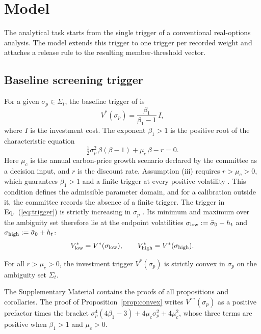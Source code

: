 \section{Model}

The analytical task starts from the single trigger of a conventional real-options analysis. The model extends this trigger to one trigger per recorded weight and attaches a release rule to the resulting member-threshold vector.

\subsection{Baseline screening trigger}

For a given $\sigma_p\in\Sigma_t$, the baseline trigger of \citet{McDonaldSiegel1986} is
\begin{equation}
V^{*}(\sigma_p)=\frac{\beta_1}{\beta_1-1}\,I,
\label{eq:trigger}
\end{equation}
where $I$ is the investment cost. The exponent $\beta_1>1$ is the positive root of the characteristic equation
\begin{equation}
\tfrac{1}{2}\sigma_p^{2}\,\beta(\beta-1)+\mu_c\,\beta-r=0.
\label{eq:char}
\end{equation}
Here $\mu_c$ is the annual carbon-price growth scenario declared by the committee as a decision input, and $r$ is the discount rate. Assumption (iii) requires $r>\mu_c>0$, which guarantees $\beta_1>1$ and a finite trigger at every positive volatility \citep{DixitPindyck1994}. This condition defines the admissible parameter domain, and for a calibration outside it, the committee records the absence of a finite trigger. The trigger in Eq.~(\ref{eq:trigger}) is strictly increasing in $\sigma_p$ \citep{DixitPindyck1994}. Its minimum and maximum over the ambiguity set therefore lie at the endpoint volatilities $\sigma_{\mathrm{low}}:=\bar{\sigma}_0-h_t$ and $\sigma_{\mathrm{high}}:=\bar{\sigma}_0+h_t$:
\begin{equation}
V^{*}_{\mathrm{low}}=V^{*}(\sigma_{\mathrm{low}}),\qquad V^{*}_{\mathrm{high}}=V^{*}(\sigma_{\mathrm{high}}).
\label{eq:endpoints}
\end{equation}

\begin{proposition}\label{prop:convex}
For all $r>\mu_c>0$, the investment trigger $V^{*}(\sigma_p)$ is strictly convex in $\sigma_p$ on the ambiguity set $\Sigma_t$.
\end{proposition}

The Supplementary Material contains the proofs of all propositions and corollaries. The proof of Proposition~\ref{prop:convex} writes $V^{*\prime\prime}(\sigma_p)$ as a positive prefactor times the bracket $\sigma_p^{4}(4\beta_1-3)+4\mu_c\sigma_p^{2}+4\mu_c^{2}$, whose three terms are positive when $\beta_1>1$ and $\mu_c>0$.

